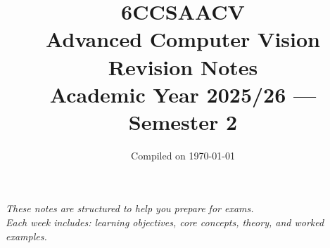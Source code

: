 \documentclass[10pt]{article}
\title{%
  \vspace{-1cm}
  {\LARGE\bfseries 6CCSAACV}\\[0.3cm]
  {\Huge Advanced Computer Vision}\\[0.5cm]
  {\Large Revision Notes}\\[0.3cm]
  {\large Academic Year 2025/26 --- Semester 2}
}
\author{}
\date{\vspace{-0.5cm}Compiled on \today}
\begin{document}
\maketitle
\thispagestyle{empty}

\vfill
\begin{center}
\textit{These notes are structured to help you prepare for exams.\\
Each week includes: learning objectives, core concepts, theory, and worked examples.}
\end{center}
\vfill

\clearpage
\tableofcontents

\clearpage


\clearpage


\clearpage


\clearpage


\clearpage


\clearpage


\clearpage


\clearpage


\clearpage


\clearpage


\clearpage

\end{document}
